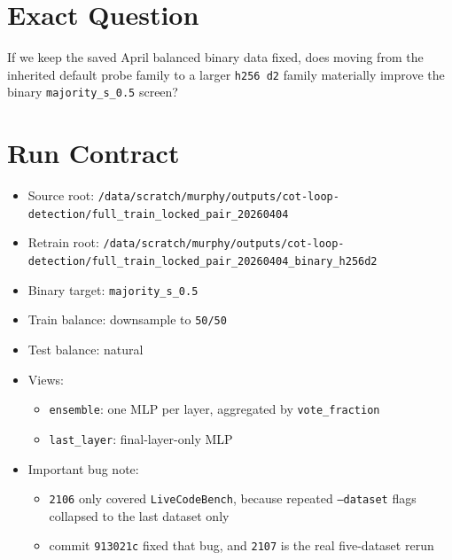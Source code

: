 \documentclass[11pt]{article}
\begin{document}
\section*{Exact Question}
If we keep the saved April balanced binary data fixed, does moving from the inherited default probe family to a larger \texttt{h256 d2} family materially improve the binary \texttt{majority\_s\_0.5} screen?

\section*{Run Contract}
\begin{itemize}[leftmargin=1.5em]
\item Source root: \texttt{/data/scratch/murphy/outputs/cot-loop-detection/full\_train\_locked\_pair\_20260404}
\item Retrain root: \texttt{/data/scratch/murphy/outputs/cot-loop-detection/full\_train\_locked\_pair\_20260404\_binary\_h256d2}
\item Binary target: \texttt{majority\_s\_0.5}
\item Train balance: downsample to \texttt{50/50}
\item Test balance: natural
\item Views:
  \begin{itemize}[leftmargin=1.5em]
  \item \texttt{ensemble}: one MLP per layer, aggregated by \texttt{vote\_fraction}
  \item \texttt{last\_layer}: final-layer-only MLP
  \end{itemize}
\item Important bug note:
  \begin{itemize}[leftmargin=1.5em]
  \item \texttt{2106} only covered \texttt{LiveCodeBench}, because repeated \texttt{--dataset} flags collapsed to the last dataset only
  \item commit \texttt{913021c} fixed that bug, and \texttt{2107} is the real five-dataset rerun
  \end{itemize}
\end{itemize}
\end{document}
